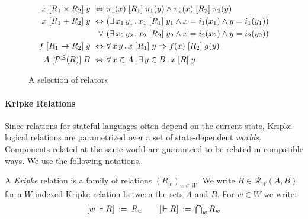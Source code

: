 \documentclass[sigplan,screen]{acmart}
\newcommand{\figsize}{\small}
\begin{document}
\begin{figure} %
  \figsize
  \begin{align*}
    x \mathrel{[{R_1 \times R_2}]} y \ \Leftrightarrow\  &
      \pi_1(x) \mathrel{[{R_1}]} \pi_1(y) \wedge
      \pi_2(x) \mathrel{[{R_2}]} \pi_2(y) \\
    x \mathrel{[{R_1 + R_2}]} y \ \Leftrightarrow\  &
      (\exists \, x_1 \, y_1 \,.\,
        x_1 \mathrel{[{R_1}]} y_1 \wedge
        x = i_1(x_1) \wedge
        y = i_1(y_1)) \\ \vee\ &
      (\exists \, x_2 \, y_2 \,.\,
        x_2 \mathrel{[{R_2}]} y_2 \wedge
        x = i_2(x_2) \wedge
        y = i_2(y_2)) \\
    f \mathrel{[{R_1 \rightarrow R_2}]} g \ \Leftrightarrow\  &
      \forall \, x \, y \,.\,
        x \mathrel{[{R_1}]} y \Rightarrow
        f(x) \mathrel{[{R_2}]} g(y) \\
    A \mathrel{[{\mathcal{P}^\le(R)}]} B \ \Leftrightarrow\  &
      \forall \, x \in A \,.\,
      \exists \, y \in B \,.\,
      x \mathrel{[{R}]} y
  \end{align*}
  \caption{A selection of relators}
  \label{fig:relators}
\end{figure}


\paragraph{Kripke Relations} %

Since relations for stateful languages
often depend on the current state,
Kripke logical relations
are parametrized over a set of state-dependent \emph{worlds}.
Components related at the same world
are guaranteed to be related in compatible ways.
We use the following notations.

\begin{definition} \label{def:klr} %
A \emph{Kripke} relation is
a family of relations $(R_w)_{w \in W}$.
We write $R \in \mathcal{R}_W(A, B)$
for a $W$-indexed Kripke relation between the sets $A$ and $B$.
For $w \in W$ we write:
\[
\begin{array}{c@{\qquad}c}
    [w \Vdash R] \: := \: R_w &
    [\Vdash R] \: := \: \bigcap_{w} R_w
\end{array}
\]
\end{definition}
\end{document}
